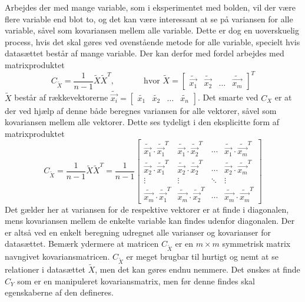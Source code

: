 Arbejdes der med mange variable, som i eksperimentet med bolden, vil der være flere variable end blot to, og det kan være interessant at se på variansen for alle variable, såvel som kovariansen mellem alle variable. Dette er dog en uoverskuelig process, hvis det skal gøres ved ovenstående metode for alle variable, specielt hvis datasættet består af mange variable. Der kan derfor med fordel arbejdes med matrixproduktet
\begin{equation}
C_{\tilde{X}}= \frac{1}{n-1} \tilde{X}\tilde{X}^T, \phantom{mmmm} \text{hvor } \tilde{X}= \begin{bmatrix} \tilde{\vec{x_1}}  & \tilde{\vec{x_2}} & \hdots	 & \tilde{\vec{x_m}} \end{bmatrix}^T
\label{eq:matrix covarians}
\end{equation}
$\tilde{X}$ består af rækkevektorerne $\tilde{\vec{x_i}}=\begin{bmatrix} \tilde{x_1} & \tilde{x_2} & \hdots & \tilde{x_n} \end{bmatrix}$.
Det smarte ved $C_X$ er at der ved hjælp af denne både beregnes variansen for alle vektorer, såvel som kovariansen mellem alle vektorer. Dette ses tydeligt i den eksplicitte form af matrixproduktet
\begin{equation}
C_{\tilde{X}}=\frac{1}{n-1} \tilde{X}\tilde{X}^T = \frac{1}{n-1} 
\begin{bmatrix}
\tilde{\vec{x_1}} \cdot {\tilde{\vec{x_1}}}^T		& \tilde{\vec{x_1}} \cdot {\tilde{\vec{x_2}}}^T	&	\cdots	&	\tilde{\vec{x_1}} \cdot {\tilde{\vec{x_m}}}^T		\\
\tilde{\vec{x_2}} \cdot {\tilde{\vec{x_1}}}^T		& \tilde{\vec{x_2}} \cdot {\tilde{\vec{x_2}}}^T	&	\cdots	&	\tilde{\vec{x_2}} \cdot {\tilde{\vec{x_m}}}^T		\\
\vdots											& \vdots											&	\ddots	&			\vdots											\\
\tilde{\vec{x_m}} \cdot {\tilde{\vec{x_1}}}^T		& \tilde{\vec{x_m}} \cdot {\tilde{\vec{x_2}}}^T	&	\cdots	&	\tilde{\vec{x_m}} \cdot {\tilde{\vec{x_m}}}^T
\end{bmatrix}
\end{equation}
Det gælder her at variansen for de respektive vektorer er at finde i diagonalen, mens kovariansen mellem de enkelte variable kan findes udenfor diagonalen. Der er altså ved en enkelt beregning udregnet alle varianser og kovarianser for datasættet. Bemærk ydermere at matricen $C_{\tilde{X}}$ er en $m \times m$ symmetrisk matrix navngivet kovariansmatricen. $C_{\tilde{X}}$ er meget brugbar til hurtigt og nemt at se relationer i datasættet $\tilde{X}$, men det kan gøres endnu nemmere. Det ønskes at finde $C_Y$ som er en manipuleret kovariansmatrix, men før denne findes skal egenskaberne af den defineres.

